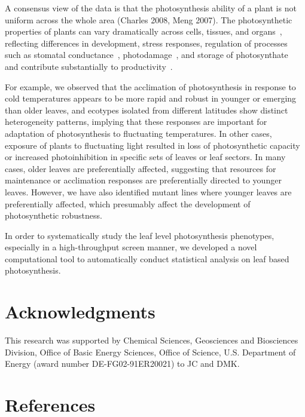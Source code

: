 {A consensus view of the data is that the photosynthesis ability of a plant is not uniform across the whole area (Charles 2008, Meng 2007).
%
The photosynthetic properties of plants can vary dramatically across cells, tissues, and organs~\cite{}, reflecting differences in development, stress responses, regulation of processes such as stomatal conductance~\cite{}, photodamage~\cite{}, and storage of photosynthate~\cite{} and contribute substantially to productivity~\cite{}.

For example, we observed that the acclimation of photosynthesis in response to cold temperatures appears to be more rapid and robust in younger or emerging than older leaves, and ecotypes isolated from different latitudes show distinct heterogeneity patterns, implying that these responses are important for adaptation of photosynthesis to fluctuating temperatures.
%
In other cases, exposure of plants to fluctuating light resulted in loss of photosynthetic capacity or increased photoinhibition in specific sets of leaves or leaf sectors. In many cases, older leaves are preferentially affected, suggesting that resources for maintenance or acclimation responses are preferentially directed to younger leaves. However, we have also identified mutant lines where younger leaves are preferentially affected, which presumably affect the development of photosynthetic robustness.

In order to systematically study the leaf level photosynthesis phenotypes, especially in a high-throughput screen manner, we developed a novel computational tool to automatically conduct statistical analysis on leaf based photosynthesis.

\section*{Acknowledgments}
This research was supported by Chemical Sciences, Geosciences and Biosciences Division, Office of Basic Energy Sciences, Office of Science, U.S. Department of Energy (award number DE-FG02-91ER20021) to JC and DMK.

\section*{References}

%
%
%

}
